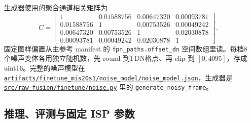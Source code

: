 \documentclass[11pt,a4paper,UTF8,fontset=fandol]{ctexart}
\newcommand{\repofile}[1]{\href{https://github.com/JingZe-Liang/SigmaStar_AIISP/blob/main/Stage2/9_19-10_1/Task3/XWJ/RECOVERED_Stage2_DenoiseModel_20261010/#1}{\nolinkurl{#1}}}
\newcommand{\dn}{\ensuremath{\,\mathrm{DN}}}
\begin{document}
生成器使用的聚合通道相关矩阵为
\begin{equation}
C=\begin{bmatrix}
1 & 0.01588756 & 0.00647320 & 0.00093781\\
0.01588756 & 1 & 0.00753526 & 0.00049242\\
0.00647320 & 0.00753526 & 1 & 0.02030878\\
0.00093781 & 0.00049242 & 0.02030878 & 1
\end{bmatrix}.
\end{equation}
固定图样偏置从主参考 manifest 的 \texttt{fpn\_paths.offset\_dn} 空间数组里读。每档8个噪声变体各用独立随机数，先 round 到1\dn{}格点、再 clip 到 $[0,4095]$，存成 uint16。完整的噪声模型在 \repofile{artifacts/finetune_mis20s1/noise_model/noise_model.json}，生成器是 \repofile{src/raw_fusion/finetune/noise.py} 里的 \texttt{generate\_noisy\_frame}。

\subsection{推理、评测与固定 ISP 参数}
\end{document}
